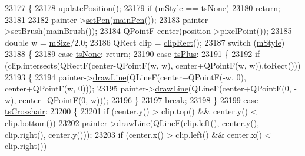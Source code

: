 \begin{DoxyCode}
23177 \{
23178   \hyperlink{class_q_c_p_item_tracer_a5b90296109e36384aedbc8908a670413}{updatePosition}();
23179   \textcolor{keywordflow}{if} (\hyperlink{class_q_c_p_item_tracer_afb1f236bebf417544e0138fef22a292e}{mStyle} == \hyperlink{class_q_c_p_item_tracer_a2f05ddb13978036f902ca3ab47076500aac27462c79146225bfa8fba24d2ee8a4}{tsNone})
23180     \textcolor{keywordflow}{return};
23181 
23182   painter->\hyperlink{class_q_c_p_painter_af9c7a4cd1791403901f8c5b82a150195}{setPen}(\hyperlink{class_q_c_p_item_tracer_af87132b7698d5bb35c96a8a0b9e7180e}{mainPen}());
23183   painter->setBrush(\hyperlink{class_q_c_p_item_tracer_aaf4e72e2d87f53279b9f9ba624961bf5}{mainBrush}());
23184   QPointF center(\hyperlink{class_q_c_p_item_tracer_a69917e2fdb2b3a929c196958feee7cbe}{position}->\hyperlink{class_q_c_p_item_position_ae490f9c76ee2ba33752c495d3b6e8fb5}{pixelPoint}());
23185   \textcolor{keywordtype}{double} w = \hyperlink{class_q_c_p_item_tracer_a575153a24bb357d1e006f6bc3bd099b9}{mSize}/2.0;
23186   QRect clip = \hyperlink{class_q_c_p_abstract_item_a538e25ff8856534582f5b2b400a46405}{clipRect}();
23187   \textcolor{keywordflow}{switch} (\hyperlink{class_q_c_p_item_tracer_afb1f236bebf417544e0138fef22a292e}{mStyle})
23188   \{
23189     \textcolor{keywordflow}{case} \hyperlink{class_q_c_p_item_tracer_a2f05ddb13978036f902ca3ab47076500aac27462c79146225bfa8fba24d2ee8a4}{tsNone}: \textcolor{keywordflow}{return};
23190     \textcolor{keywordflow}{case} \hyperlink{class_q_c_p_item_tracer_a2f05ddb13978036f902ca3ab47076500a3323fb04017146e4885e080a459472fa}{tsPlus}:
23191     \{
23192       \textcolor{keywordflow}{if} (clip.intersects(QRectF(center-QPointF(w, w), center+QPointF(w, w)).toRect()))
23193       \{
23194         painter->\hyperlink{class_q_c_p_painter_a0b4b1b9bd495e182c731774dc800e6e0}{drawLine}(QLineF(center+QPointF(-w, 0), center+QPointF(w, 0)));
23195         painter->\hyperlink{class_q_c_p_painter_a0b4b1b9bd495e182c731774dc800e6e0}{drawLine}(QLineF(center+QPointF(0, -w), center+QPointF(0, w)));
23196       \}
23197       \textcolor{keywordflow}{break};
23198     \}
23199     \textcolor{keywordflow}{case} \hyperlink{class_q_c_p_item_tracer_a2f05ddb13978036f902ca3ab47076500af562ec81ac3ba99e26ef8540cf1ec16f}{tsCrosshair}:
23200     \{
23201       \textcolor{keywordflow}{if} (center.y() > clip.top() && center.y() < clip.bottom())
23202         painter->\hyperlink{class_q_c_p_painter_a0b4b1b9bd495e182c731774dc800e6e0}{drawLine}(QLineF(clip.left(), center.y(), clip.right(), center.y()));
23203       \textcolor{keywordflow}{if} (center.x() > clip.left() && center.x() < clip.right())

\end{DoxyCode}
